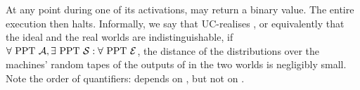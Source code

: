   At any point during one of its activations, \environment may return a binary
  value. The entire execution then halts. Informally, we say that \prot
  UC-realises \func, or equivalently that the ideal and the real worlds are
  indistinguishable, if $\forall \text{ PPT } \mathcal{A}, \exists \text{ PPT }
  \mathcal{S}: \forall \text{ PPT } \mathcal{E}$, the distance of the
  distributions over the machines' random tapes of the outputs of \environment
  in the two worlds is negligibly small. Note the order of quantifiers:
  \simulator depends on \adversary, but not on \environment.
